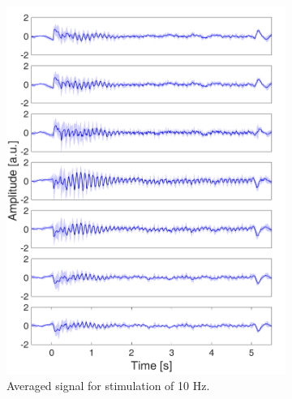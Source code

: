 \documentclass{pracalicmgr}
\begin{document}
\begin{figure}[H]
	\begin{subfigure}{.5\textwidth}
	\centering
	\includegraphics[width=1.\linewidth]{srednie_10Hz_5s.png}
	\caption{Averaged signal for stimulation of 10 Hz.}
	\label{rys:srednie_10Hz}
	\end{subfigure}
	\begin{subfigure}{.5\textwidth}
	\centering

\end{subfigure}
\end{figure}
\end{document}
